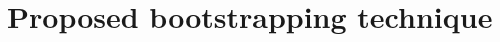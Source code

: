 \section{Proposed bootstrapping technique}
\label{sec-our-technique}

\cite{Strandh:2015:ELS:Environments}
\cite{Strandh:2014:RMI:2635648.2635656}
